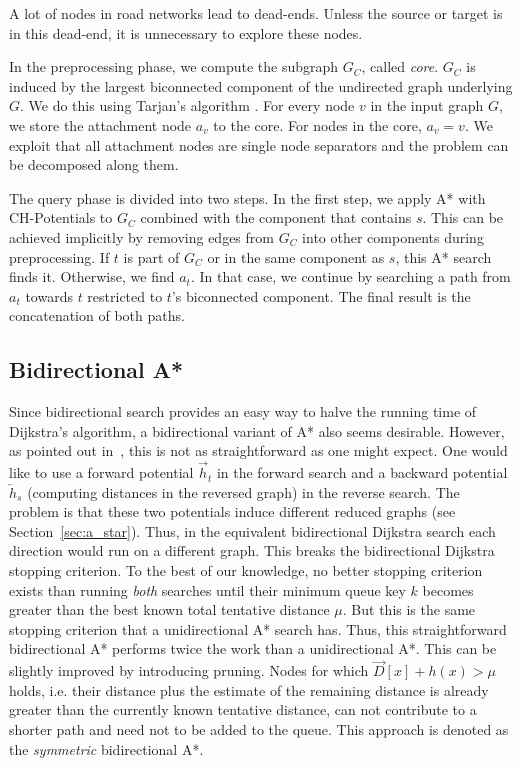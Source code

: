\documentclass[manuscript,review]{acmart}
\begin{document}
A lot of nodes in road networks lead to dead-ends.
Unless the source or target is in this dead-end, it is unnecessary to explore these nodes.

In the preprocessing phase, we compute the subgraph $G_C$, called \emph{core}.
$G_C$ is induced by the largest biconnected component of the undirected graph underlying $G$.
We do this using Tarjan's algorithm \cite{t-dfslg2-72}.
For every node $v$ in the input graph $G$, we store the attachment node $a_v$ to the core.
For nodes in the core, $a_v=v$.
We exploit that all attachment nodes are single node separators and the problem can be decomposed along them.

The query phase is divided into two steps.
In the first step, we apply A* with CH-Potentials to $G_C$ combined with the component that contains $s$.
This can be achieved implicitly by removing edges from $G_C$ into other components during preprocessing.
If $t$ is part of $G_C$ or in the same component as $s$, this A* search finds it.
Otherwise, we find $a_t$.
In that case, we continue by searching a path from $a_t$ towards $t$ restricted to $t$'s biconnected component.
The final result is the concatenation of both paths.

\subsection{Bidirectional A*}\label{sec:bidir_astar}

Since bidirectional search provides an easy way to halve the running time of Dijkstra's algorithm, a bidirectional variant of A* also seems desirable.
However, as pointed out in~\cite{gh-cspas-05}, this is not as straightforward as one might expect.
One would like to use a forward potential $\overrightarrow{h}_t$ in the forward search and a backward potential $\overleftarrow{h}_s$ (computing distances in the reversed graph) in the reverse search.
The problem is that these two potentials induce different reduced graphs (see Section~\ref{sec:a_star}).
Thus, in the equivalent bidirectional Dijkstra search each direction would run on a different graph.
This breaks the bidirectional Dijkstra stopping criterion.
To the best of our knowledge, no better stopping criterion exists than running \emph{both} searches until their minimum queue key $k$ becomes greater than the best known total tentative distance $\mu$.
But this is the same stopping criterion that a unidirectional A* search has.
Thus, this straightforward bidirectional A* performs twice the work than a unidirectional A*.
This can be slightly improved by introducing pruning.
Nodes for which $\overrightarrow{D}[x] + h(x) > \mu$ holds, i.e. their distance plus the estimate of the remaining distance is already greater than the currently known tentative distance, can not contribute to a shorter path and need not to be added to the queue.
This approach is denoted as the \emph{symmetric} bidirectional A*.
\end{document}
